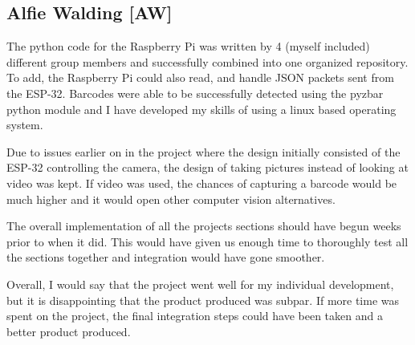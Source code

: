 \subsection{Alfie Walding [AW]}
The python code for the Raspberry Pi was written by 4 (myself included) different group members and successfully combined into one organized repository.
To add, the Raspberry Pi could also read, and handle JSON packets sent from the ESP-32.
Barcodes were able to be successfully detected using the pyzbar python module and I have developed my skills of using a linux based operating system.

Due to issues earlier on in the project where the design initially consisted of the ESP-32 controlling the camera, the design of taking pictures instead of looking at video was kept.
If video was used, the chances of capturing a barcode would be much higher and it would open other computer vision alternatives.

The overall implementation of all the projects sections should have begun weeks prior to when it did.
This would have given us enough time to thoroughly test all the sections together and integration would have gone smoother.

Overall, I would say that the project went well for my individual development, but it is disappointing that the product produced was subpar.
If more time was spent on the project, the final integration steps could have been taken and a better product produced.